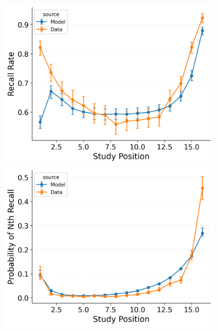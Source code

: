 \documentclass[
  man,
  floatsintext,
  longtable,
  nolmodern,
  notxfonts,
  notimes,
  draftfirst,
  colorlinks=true,linkcolor=blue,citecolor=blue,urlcolor=blue]{apa7}
\begin{document}
\begin{figure}
\begin{minipage}{0.33\linewidth}
\includegraphics{figures/HealeyKahana2014_CRU_with_Pre-Expt__Primacy__and_StartDrift_Fitting_spc.png}\end{minipage}%
\newline
\begin{minipage}{0.33\linewidth}
\includegraphics{figures/HealeyKahana2014_CRU_with_Feature-to-Context__Primacy__and_StartDrift_Fitting_pnr.png}\end{minipage}%
%
\begin{minipage}{0.33\linewidth}

\end{minipage}
\end{figure}
\end{document}
